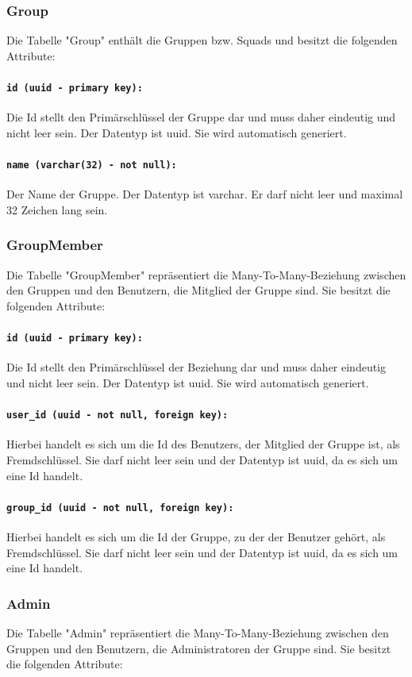 \documentclass{entwurfsheft}
\begin{document}
\subsubsection{Group}
Die Tabelle "Group" enthält die Gruppen bzw. Squads und besitzt die folgenden Attribute:
\paragraph{\texttt{id (uuid - primary key):}} Die Id stellt den Primärschlüssel der Gruppe dar und muss daher eindeutig und nicht leer sein. Der Datentyp ist \Gls{uuid}. Sie wird automatisch generiert.
\paragraph{\texttt{name (varchar(32) - not null):}} Der Name der Gruppe. Der Datentyp ist \Gls{varchar}. Er darf nicht leer und maximal 32 Zeichen lang sein.
\newpage
\subsubsection{GroupMember}
Die Tabelle "GroupMember" repräsentiert die Many-To-Many-Beziehung zwischen den Gruppen und den Benutzern, die Mitglied der Gruppe sind. Sie besitzt die folgenden Attribute:
\paragraph{\texttt{id (uuid - primary key):}} Die Id stellt den Primärschlüssel der Beziehung dar und muss daher eindeutig und nicht leer sein. Der Datentyp ist \Gls{uuid}. Sie wird automatisch generiert.
\paragraph{\texttt{user\_id (uuid - not null, foreign key):}} Hierbei handelt es sich um die Id des Benutzers, der Mitglied der Gruppe ist, als Fremdschlüssel. Sie darf nicht leer sein und der Datentyp ist \Gls{uuid}, da es sich um eine Id handelt.
\paragraph{\texttt{group\_id (uuid - not null, foreign key):}} Hierbei handelt es sich um die Id der Gruppe, zu der der Benutzer gehört, als Fremdschlüssel. Sie darf nicht leer sein und der Datentyp ist \Gls{uuid}, da es sich um eine Id handelt.
\newpage
\subsubsection{Admin}
Die Tabelle "Admin" repräsentiert die Many-To-Many-Beziehung zwischen den Gruppen und den Benutzern, die Administratoren der Gruppe sind. Sie besitzt die folgenden Attribute:
\end{document}
